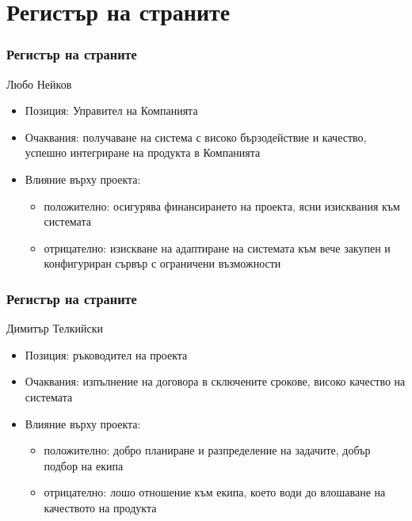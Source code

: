\documentclass{beamer}
\begin{document}
\section{Регистър на страните}
\begin{frame}
    \frametitle{Регистър на страните}
    \begin{block}{Любо Нейков}
        \begin{itemize}
            \item Позиция: Управител на Компанията
            \item Очаквания: получаване на система с високо бързодействие и качество,
                успешно интегриране на продукта в Компанията
            \item Влияние върху проекта:
                \begin{itemize}
                    \item положително: осигурява финансирането на проекта, ясни изисквания към системата
                    \item отрицателно: изискване на адаптиране на системата
                    към вече закупен и конфигуриран сървър с ограничени
                    възможности
                \end{itemize}
        \end{itemize}
    \end{block}
\end{frame}

\begin{frame}
    \frametitle{Регистър на страните}
    \begin{block}{Димитър Телкийски}
        \begin{itemize}
            \item Позиция: ръководител на проекта
            \item Очаквания: изпълнение на договора в сключените срокове, високо качество на системата
            \item Влияние върху проекта:
                \begin{itemize}
                    \item положително: добро планиране и разпределение на
                    задачите, добър подбор на екипа
                    \item отрицателно: лошо отношение към екипа, което води
                    до влошаване на качеството на продукта
                \end{itemize}
        \end{itemize}
    \end{block}
\end{frame}
\end{document}

